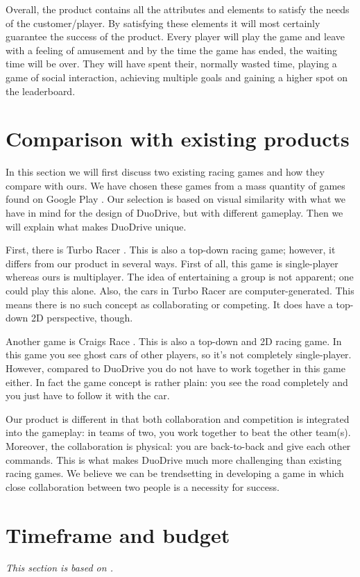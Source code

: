 \documentclass[12pt,twoside,a4paper]{article}
\begin{document}
Overall, the product contains all the attributes and elements to satisfy the needs of the customer/player. By satisfying these elements it will most certainly guarantee the success of the product. Every player will play the game and leave with a feeling of amusement and by the time the game has ended, the waiting time will be over. They will have spent their, normally wasted time, playing a game of social interaction, achieving multiple goals and gaining a higher spot on the leaderboard. \clearpage

\section{Comparison with existing products}
In this section we will first discuss two existing racing games and how they compare with ours. We have chosen these games from a mass quantity of games found on Google Play \cite{googleplay}. Our selection is based on visual similarity with what we have in mind for the design of DuoDrive, but with different gameplay. Then we will explain what makes DuoDrive unique.

First, there is Turbo Racer \cite{turboracer}. This is also a top-down racing game; however, it differs from our product in several ways. First of all, this game is single-player whereas ours is multiplayer. The idea of entertaining a group is not apparent; one could play this alone. Also, the cars in Turbo Racer are computer-generated. This means there is no such concept as collaborating or competing. It does have a top-down 2D perspective, though.

Another game is Craigs Race \cite{craigsrace1} \cite{craigsrace2}. This is also a top-down and 2D racing game. In this game you see ghost cars of other players, so it's not completely single-player. However, compared to DuoDrive you do not have to work together in this game either. In fact the game concept is rather plain: you see the road completely and you just have to follow it with the car.

Our product is different in that both collaboration and competition is integrated into the gameplay: in teams of two, you work together to beat the other team(s). Moreover, the collaboration is physical: you are back-to-back and give each other commands. This is what makes DuoDrive much more challenging than existing racing games. We believe we can be trendsetting in developing a game in which close collaboration between two people is a necessity for success.


\section{Timeframe and budget}
{\itshape This section is based on \cite{gamesplanning}.}
\end{document}
